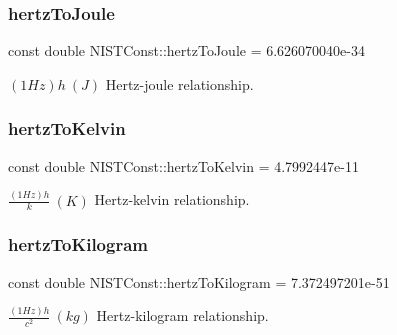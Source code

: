 \subsubsection{\texorpdfstring{hertz\+To\+Joule}{hertzToJoule}}
{\footnotesize\ttfamily const double N\+I\+S\+T\+Const\+::hertz\+To\+Joule = 6.\+626070040e-\/34}

$(1 Hz)h \ (J)$ Hertz-\/joule relationship. \mbox{\label{group___hertz_gacda137a5d10ebba59b340d770802678f}} 
\subsubsection{\texorpdfstring{hertz\+To\+Kelvin}{hertzToKelvin}}
{\footnotesize\ttfamily const double N\+I\+S\+T\+Const\+::hertz\+To\+Kelvin = 4.\+7992447e-\/11}

$\frac{(1 Hz)h}{k} \ (K)$ Hertz-\/kelvin relationship. \mbox{\label{group___hertz_ga7b63758ab74cb80c236d4eacd5b89484}} 
\subsubsection{\texorpdfstring{hertz\+To\+Kilogram}{hertzToKilogram}}
{\footnotesize\ttfamily const double N\+I\+S\+T\+Const\+::hertz\+To\+Kilogram = 7.\+372497201e-\/51}

$\frac{(1 Hz)h}{c^2} \ (kg)$ Hertz-\/kilogram relationship. 